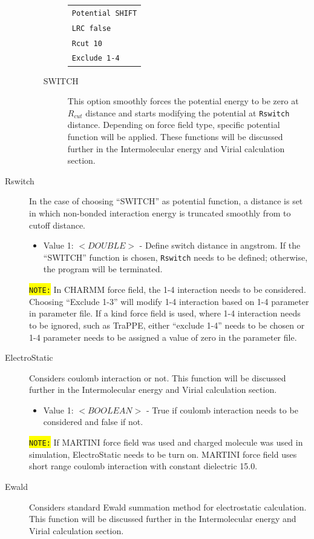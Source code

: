 \begin{description}
\begin{itemize}
\begin{description}
{\begin{tabular}{l}
		\texttt{Potential SHIFT}\\
		\texttt{LRC false}\\
		\texttt{Rcut 10}\\
		\texttt{Exclude 1-4}\\
		\end{tabular}}
		\item [SWITCH] This option smoothly forces the potential energy to be zero at $R_{cut}$ distance and starts modifying the potential at \texttt{Rswitch} distance. Depending on force field type, specific potential function will be applied. These functions will be discussed further in the Intermolecular energy and Virial calculation section.
		\end{description}
	\end{itemize}
\item [Rswitch] In the case of choosing “SWITCH” as potential function, a distance is set in which non-bonded interaction energy is truncated smoothly from to cutoff distance.
	\begin{itemize}
	\item Value 1: $<DOUBLE>$ - Define switch distance in angstrom. If the ``SWITCH'' function is chosen, \texttt{Rswitch} needs to be defined; otherwise, the program will be terminated. 
	\end{itemize}
\colorbox{yellow}{\texttt{NOTE:}} In CHARMM force field, the 1-4 interaction needs to be considered. Choosing ``Exclude 1-3'' will modify 1-4 interaction based on 1-4 parameter in parameter file. If a kind force field is used, where 1-4 interaction needs to be ignored, such as TraPPE, either ``exclude 1-4'' needs to be chosen or 1-4 parameter needs to be assigned a value of zero in the parameter file.
\item [ElectroStatic] Considers coulomb interaction or not. This function will be discussed further in the Intermolecular energy and Virial calculation section.
	\begin{itemize}
	\item Value 1: $<BOOLEAN>$ - True if coulomb interaction needs to be considered and false if not.
	\end{itemize}
	\colorbox{yellow}{\texttt{NOTE:}} If MARTINI force field was used and charged molecule was used in simulation, ElectroStatic needs to be turn on. MARTINI force field uses short range coulomb interaction with constant dielectric 15.0.
\item [Ewald] Considers standard Ewald summation method for electrostatic calculation. This function will be discussed further in the Intermolecular energy and Virial calculation section.

\end{description}
